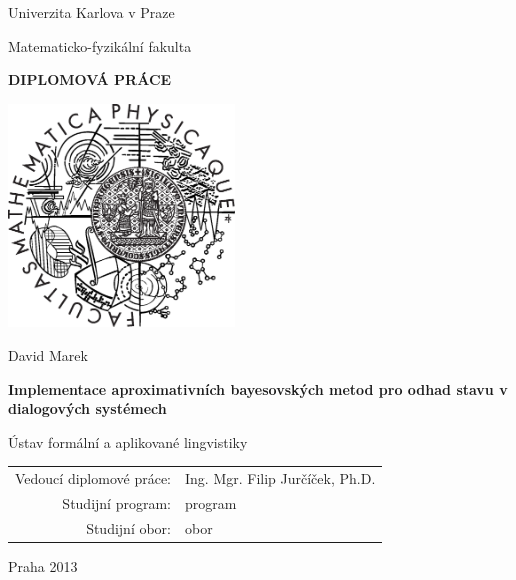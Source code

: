 \documentclass[12pt,a4paper]{report}
\begin{document}


\pagestyle{empty}
\begin{center}

\large

Univerzita Karlova v Praze

\medskip

Matematicko-fyzikální fakulta

\vfill

{\bf\Large DIPLOMOVÁ PRÁCE}

\vfill

\centerline{\mbox{\includegraphics[width=60mm]{../img/logo.eps}}}

\vfill
\vspace{5mm}

{\LARGE David Marek}

\vspace{15mm}

{\LARGE\bfseries Implementace aproximativních bayesovských metod pro odhad stavu v dialogových systémech}

\vfill

Ústav formální a aplikované lingvistiky

\vfill

\begin{tabular}{rl}

Vedoucí diplomové práce: & Ing. Mgr. Filip Jurčíček, Ph.D. \\
\noalign{\vspace{2mm}}
Studijní program: & program \\
\noalign{\vspace{2mm}}
Studijní obor: & obor \\
\end{tabular}

\vfill

Praha 2013

\end{center}
\end{document}
